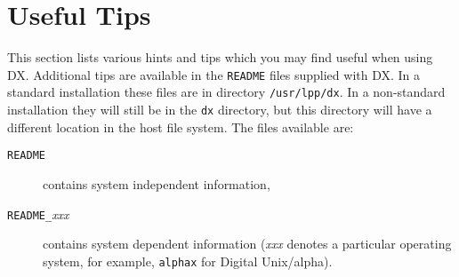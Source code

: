 \section{Useful Tips \label{TIPS}  }

This section lists various hints and tips which you may find useful when
using DX. Additional tips are available in the {\tt{README}} files
supplied with DX. In a standard installation these files are in directory
{\tt{/usr/lpp/dx}}. In a non-standard installation they will still be in
the {\tt{dx}} directory, but this directory will have a different location
in the host file system. The files available are:

\begin{description}

  \item[{\tt README}] contains system independent information,

  \item[{\tt README\_}{\it xxx}] contains system dependent information
   ({\it xxx} denotes a particular operating system, for example,
   {\tt alphax} for Digital Unix/alpha).

\end{description}

